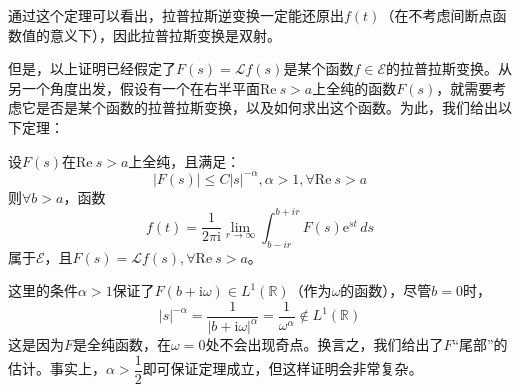 通过这个定理可以看出，拉普拉斯逆变换一定能还原出$f(t)$（在不考虑间断点函数值的意义下），因此拉普拉斯变换是双射。

但是，以上证明已经假定了$F(s)=\mathcal{L} f(s)$是某个函数$f\in\mathcal{E} $的拉普拉斯变换。从另一个角度出发，假设有一个在右半平面$\text{Re}\ s>a$上全纯的函数$F(s)$，就需要考虑它是否是某个函数的拉普拉斯变换，以及如何求出这个函数。为此，我们给出以下定理\cite{distribution}：
\begin{theorem}[*拉普拉斯反演公式]
    设$F(s)$在$\text{Re}\ s>a$上全纯，且满足：
    \[|F(s)|\leq C|s|^{-\alpha},\alpha>1,\forall \text{Re}\ s>a\]
    则$\forall b>a$，函数
    \[f(t)=\frac{1}{2\pi \mathrm{i}}\lim_{r\to\infty}\int_{b-ir}^{b +ir}F(s)\mathrm{e}^{st}\,ds\]
    属于$\mathcal{E} $，且$F(s)=\mathcal{L} f(s),\forall \text{Re}\ s>a$。
\end{theorem}
\begin{remark}
    这里的条件$\alpha>1$保证了$F(b+\mathrm{i}\omega)\in L^1(\mathbb{R})$（作为$\omega$的函数），尽管$b=0$时，
    $$|s|^{-\alpha}=\dfrac{1}{|b+\mathrm{i}\omega|^{\alpha}}=\frac{1}{\omega^{\alpha}}\notin L^1(\mathbb{R})$$
    这是因为$F$是全纯函数，在$\omega=0$处不会出现奇点。换言之，我们给出了$F$“尾部”的估计。事实上，$\alpha>\dfrac{1}{2}$即可保证定理成立，但这样证明会非常复杂\cite{folland}。
\end{remark}

